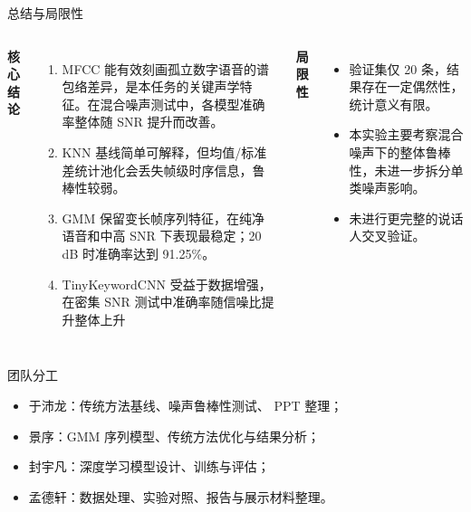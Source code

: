 \begin{frame}{总结与局限性}
  \footnotesize
  \begin{columns}[T,totalwidth=\textwidth]
    \textbf{\large 核心结论}
    \vspace{2pt}
    \begin{enumerate}
      \setlength{\itemsep}{3pt}
      \item MFCC 能有效刻画孤立数字语音的谱包络差异，是本任务的关键声学特征。在混合噪声测试中，各模型准确率整体随 SNR 提升而改善。
      \item KNN 基线简单可解释，但均值/标准差统计池化会丢失帧级时序信息，鲁棒性较弱。
      \item GMM 保留变长帧序列特征，在纯净语音和中高 SNR 下表现最稳定；20 dB 时准确率达到 91.25\%。
      \item TinyKeywordCNN 受益于数据增强，在密集 SNR 测试中准确率随信噪比提升整体上升
    \end{enumerate}

    \vspace{5pt}
    \textbf{\large 局限性}
    \vspace{2pt}
    \begin{itemize}
      \setlength{\itemsep}{2pt}
      \item 验证集仅 20 条，结果存在一定偶然性，统计意义有限。
      \item 本实验主要考察混合噪声下的整体鲁棒性，未进一步拆分单类噪声影响。
      \item 未进行更完整的说话人交叉验证。
    \end{itemize}
  \end{columns}
\end{frame}

\begin{frame}{团队分工}

\vspace{2pt}
    \begin{itemize}
      \setlength{\itemsep}{2pt}
      \item 于沛龙：传统方法基线、噪声鲁棒性测试、 PPT 整理；
      \item 景序：GMM 序列模型、传统方法优化与结果分析；
      \item 封宇凡：深度学习模型设计、训练与评估；
      \item 孟德轩：数据处理、实验对照、报告与展示材料整理。
    \end{itemize}

\end{frame}
